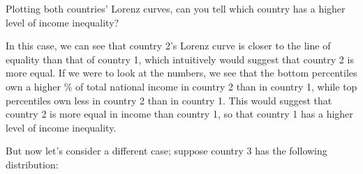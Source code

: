 \documentclass[letterpaper,10pt,english]{jupyterBook}
\begin{document}
\sphinxAtStartPar
Plotting both countries’ Lorenz curves, can you tell which country has a higher level of income inequality?

\noindent{}

\sphinxAtStartPar
In this case, we can see that country 2’s Lorenz curve is closer to the line of equality than that of country 1, which intuitively would suggest that country 2 is more equal. If we were to look at the numbers, we see that the bottom percentiles own a higher \% of total national income in country 2 than in country 1, while top percentiles own less in country 2 than in country 1. This would suggest that country 2 is more equal in income than country 1, so that country 1 has a higher level of income inequality.

\sphinxAtStartPar
But now let’s consider a different case; suppose country 3 has the following distribution:
\end{document}
